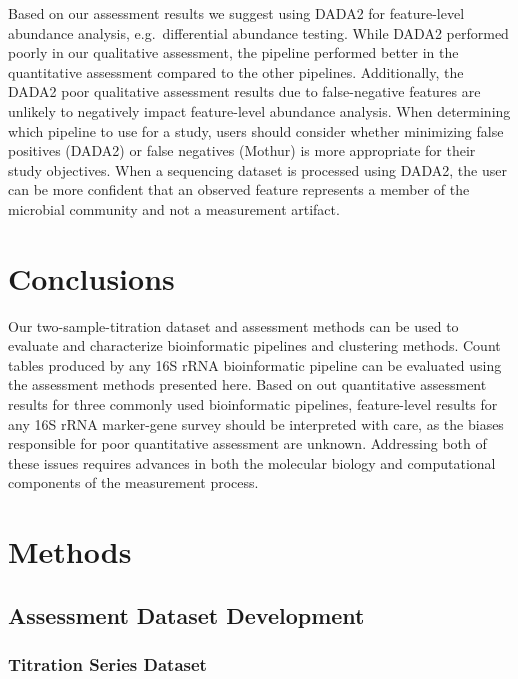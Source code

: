\documentclass[linenumbers]{bmcart}
\begin{document}
Based on our assessment results we suggest using DADA2 for feature-level abundance analysis, e.g.~differential abundance testing.
While DADA2 performed poorly in our qualitative assessment, the pipeline performed better in the quantitative assessment compared to the other pipelines.
Additionally, the DADA2 poor qualitative assessment results due to false-negative features are unlikely to negatively impact feature-level abundance analysis.
When determining which pipeline to use for a study, users should consider whether minimizing false positives (DADA2) or false negatives (Mothur) is more appropriate for their study objectives.
When a sequencing dataset is processed using DADA2, the user can be more confident that an observed feature represents a member of the microbial community and not a measurement artifact.


\section*{Conclusions}
Our two-sample-titration dataset and assessment methods can be used to evaluate and characterize bioinformatic pipelines and clustering methods.
Count tables produced by any 16S rRNA bioinformatic pipeline can be evaluated using the assessment methods presented here.
Based on out quantitative assessment results for three commonly used bioinformatic pipelines, feature-level results for any 16S rRNA marker-gene survey should be interpreted with care, as the biases responsible for poor quantitative assessment are unknown.
Addressing both of these issues requires advances in both the molecular biology and
computational components of the measurement process.





\section*{Methods}

\subsection*{Assessment Dataset Development}
\subsubsection*{Titration Series Dataset}
\end{document}
